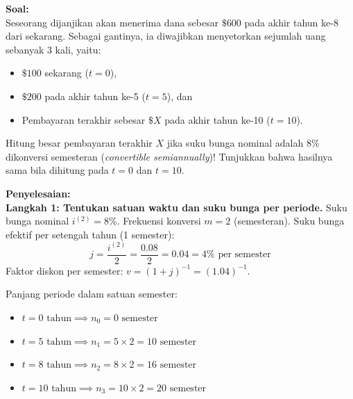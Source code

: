 \documentclass[11pt,a4paper]{article}
\begin{document}
\begin{examplebox}
\textbf{Soal:}\\
Seseorang dijanjikan akan menerima dana sebesar $\$600$ pada akhir tahun ke-8 dari sekarang. Sebagai gantinya, ia diwajibkan menyetorkan sejumlah uang sebanyak 3 kali, yaitu:
\begin{itemize}
    \item $\$100$ sekarang ($t = 0$),
    \item $\$200$ pada akhir tahun ke-5 ($t = 5$), dan
    \item Pembayaran terakhir sebesar $\$X$ pada akhir tahun ke-10 ($t = 10$).
\end{itemize}
Hitung besar pembayaran terakhir $X$ jika suku bunga nominal adalah $8\%$ dikonversi semesteran (\textit{convertible semiannually})! Tunjukkan bahwa hasilnya sama bila dihitung pada $t = 0$ dan $t = 10$.

\vspace{0.5em}
\textbf{Penyelesaian:}\\
\textbf{Langkah 1: Tentukan satuan waktu dan suku bunga per periode.}
Suku bunga nominal $i^{(2)} = 8\%$. Frekuensi konversi $m = 2$ (semesteran).
Suku bunga efektif per setengah tahun (1 semester):
\begin{equation*}
    j = \frac{i^{(2)}}{2} = \frac{0.08}{2} = 0.04 = 4\% \text{ per semester}
\end{equation*}
Faktor diskon per semester: $v = (1 + j)^{-1} = (1.04)^{-1}$.

Panjang periode dalam satuan semester:
\begin{itemize}
    \item $t = 0 \text{ tahun} \implies n_0 = 0 \text{ semester}$
    \item $t = 5 \text{ tahun} \implies n_1 = 5 \times 2 = 10 \text{ semester}$
    \item $t = 8 \text{ tahun} \implies n_2 = 8 \times 2 = 16 \text{ semester}$
    \item $t = 10 \text{ tahun} \implies n_3 = 10 \times 2 = 20 \text{ semester}$
\end{itemize}

\begin{center}
\end{center}


\end{examplebox}
\end{document}
